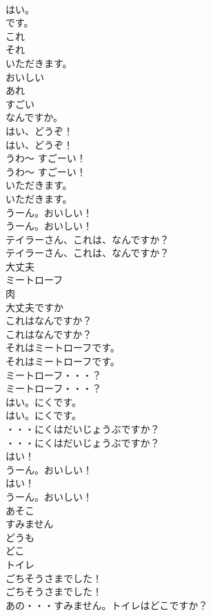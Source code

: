 \documentclass[8pt]{extreport}
\begin{document}
\begin{CJK}{UTF8}{min}
\\	はい。
\\	です。 
\\	これ
\\	それ
\\	いただきます。
\\	おいしい
\\	あれ
\\	すごい
\\	なんですか。
\\	はい、どうぞ！	
\\	はい、どうぞ！ 
\\	うわ～ すごーい！	
\\	うわ～ すごーい！ 
\\	いただきます。	
\\	いただきます。 
\\	うーん。おいしい！	
\\	うーん。おいしい！ 
\\	テイラーさん、これは、なんですか？	
\\	テイラーさん、これは、なんですか？ 
\\	大丈夫
\\	ミートローフ
\\	肉
\\	大丈夫ですか
\\	これはなんですか？	
\\	これはなんですか？ 
\\	それはミートローフです。	
\\	それはミートローフです。 
\\	ミートローフ・・・？	
\\	ミートローフ・・・？ 
\\	はい。にくです。	
\\	はい。にくです。 
\\	・・・にくはだいじょうぶですか？	
\\	・・・にくはだいじょうぶですか？ 
\\	はい！
\\	うーん。おいしい！	
\\	はい！
\\	うーん。おいしい！ 
\\	あそこ
\\	すみません
\\	どうも
\\	どこ
\\	トイレ
\\	ごちそうさまでした！	
\\	ごちそうさまでした！ 
\\	あの・・・すみません。トイレはどこですか？	

\end{CJK}
\end{document}

